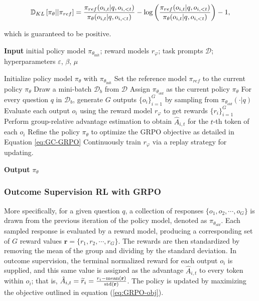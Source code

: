 \begin{itemize}[topsep=0pt]
\begin{itemize}[topsep=0pt]
\begin{equation}
\small
    \mathbb{D}_{KL}\left[\pi_{\theta} || \pi_{ref}\right] = \frac{\pi_{ref}(o_{i,t}|q,o_{i,<t})}{\pi_{\theta}(o_{i,t}|q,o_{i,<t})} - \log\left(\frac{\pi_{ref}(o_{i,t}|q,o_{i,<t})}{\pi_{\theta}(o_{i,t}|q,o_{i,<t})}\right) - 1,
\end{equation}

which is guaranteed to be positive.

\begin{algorithm}[t]
  \small
  \caption{Iterative Group Relative Policy Optimization}
  \textbf{Input} initial policy model $\pi_{\theta_{\text{init}}}$; reward models $r_\varphi$; task prompts $\mathcal{D}$; 
  hyperparameters $\varepsilon$, $\beta$, $\mu$
  \begin{algorithmic}[1]
    \State Initialize policy model $\pi_\theta$ with $\pi_{\theta_{\text{init}}}$
      \State Set the reference model $\pi_{ref}$ to the current policy $\pi_{\theta}$
        \State Draw a mini-batch $\mathcal{D}_b$ from $\mathcal{D}$
        \State Assign $\pi_{\theta_{old}}$ as the current policy $\pi_{\theta}$
        \State For every question $q$ in $\mathcal{D}_b$, generate $G$ outputs $\{o_i\}_{i=1}^G$ by sampling from $\pi_{\theta_{old}}(\cdot|q)$
        \State Evaluate each output $o_i$ using the reward model $r_{\varphi}$ to get rewards $\{r_i\}_{i=1}^{G}$
        \State Perform group-relative advantage estimation to obtain $\hat{A}_{i,t}$ for the $t$-th token of each $o_i$
          \State Refine the policy $\pi_\theta$ to optimize the GRPO objective as detailed in Equation \ref{eq:GC-GRPO}
        \EndFor
      \EndFor
      \State Continuously train $r_\varphi$ via a replay strategy for updating.
    \EndFor
  \end{algorithmic}
  \textbf{Output} $\pi_\theta$
  \label{alg:iter-grpo}
\end{algorithm}

\subsubsection{Outcome Supervision RL with GRPO} More specifically, for a given question $q$, a collection of responses $\{o_1, o_2, \cdots, o_G\}$ is drawn from the previous iteration of the policy model, denoted as $\pi_{\theta_{old}}$. Each sampled response is evaluated by a reward model, producing a corresponding set of $G$ reward values $\mathbf{r} = \{r_1, r_2, \cdots, r_G\}$. The rewards are then standardized by removing the mean of the group and dividing by the standard deviation. In outcome supervision, the terminal normalized reward for each output $o_i$ is supplied, and this same value is assigned as the advantage $\hat{A}_{i, t}$ to every token within $o_i$; that is, $\hat{A}_{i, t} = \widetilde{r}_i = \frac{r_i- {\rm mean}(\mathbf{r})}{{\rm std}(\mathbf{r})}$. The policy is updated by maximizing the objective outlined in equation (\ref{eq:GRPO-obj}).


\end{itemize}
\end{itemize}
